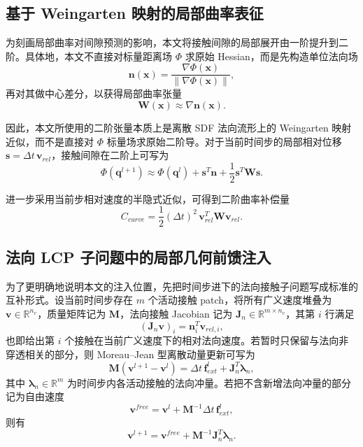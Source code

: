 \subsection{基于 Weingarten 映射的局部曲率表征}

为刻画局部曲率对间隙预测的影响，本文将接触间隙的局部展开由一阶提升到二阶。具体地，本文不直接对标量距离场 $\Phi$ 求原始 Hessian，而是先构造单位法向场
\begin{equation}
    \mathbf{n}(\mathbf{x}) = \frac{\nabla \Phi(\mathbf{x})}{\|\nabla \Phi(\mathbf{x})\|},
\end{equation}
再对其做中心差分，以获得局部曲率张量
\begin{equation}
    \mathbf{W}(\mathbf{x}) \approx \nabla \mathbf{n}(\mathbf{x}).
\end{equation}

因此，本文所使用的二阶张量本质上是离散 SDF 法向流形上的 Weingarten 映射近似，而不是直接对 $\Phi$ 标量场求原始二阶导。对于当前时间步的局部相对位移 $\mathbf{s} = \Delta t \, \mathbf{v}_{rel}$，接触间隙在二阶上可写为
\begin{equation}
    \Phi(\mathbf{q}^{l+1}) \approx \Phi(\mathbf{q}^{l}) + \mathbf{s}^T \mathbf{n} + \frac{1}{2}\mathbf{s}^T \mathbf{W}\mathbf{s}.
\end{equation}

进一步采用当前步相对速度的半隐式近似，可得到二阶曲率补偿量
\begin{equation}
    C_{curve} = \frac{1}{2} (\Delta t)^2 \, \mathbf{v}_{rel}^T \mathbf{W} \mathbf{v}_{rel}.
\end{equation}

\subsection{法向 LCP 子问题中的局部几何前馈注入}

为了更明确地说明本文的注入位置，先把时间步进下的法向接触子问题写成标准的互补形式。设当前时间步存在 $m$ 个活动接触 patch，将所有广义速度堆叠为 $\mathbf{v}\in\mathbb{R}^{n_v}$，质量矩阵记为 $\mathbf{M}$，法向接触 Jacobian 记为 $\mathbf{J}_n\in\mathbb{R}^{m\times n_v}$，其第 $i$ 行满足
\begin{equation}
    (\mathbf{J}_n \mathbf{v})_i = \mathbf{n}_i^T \mathbf{v}_{rel,i},
\end{equation}
也即给出第 $i$ 个接触在当前广义速度下的相对法向速度。若暂时只保留与法向非穿透相关的部分，则 Moreau--Jean 型离散动量更新可写为
\begin{equation}
    \mathbf{M}(\mathbf{v}^{l+1} - \mathbf{v}^{l}) = \Delta t\,\mathbf{f}^{l}_{ext} + \mathbf{J}_n^T \boldsymbol{\lambda}_n,
\end{equation}
其中 $\boldsymbol{\lambda}_n\in\mathbb{R}^{m}$ 为时间步内各活动接触的法向冲量。若把不含新增法向冲量的部分记为自由速度
\begin{equation}
    \mathbf{v}^{free} = \mathbf{v}^{l} + \mathbf{M}^{-1}\Delta t\,\mathbf{f}^{l}_{ext},
\end{equation}
则有
\begin{equation}
    \mathbf{v}^{l+1} = \mathbf{v}^{free} + \mathbf{M}^{-1}\mathbf{J}_n^T \boldsymbol{\lambda}_n.
\end{equation}

